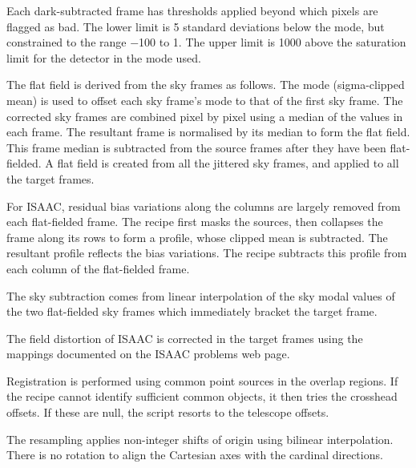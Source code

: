 \documentclass[twoside,11pt]{article}
\newcommand{\htmladdnormallink}[2]{#1}
\renewcommand{\_}{\texttt{\symbol{95}}}
\newcommand{\sstitem}{\item}
\begin{document}
{{{         \sstitem
         Each dark-subtracted frame has thresholds applied beyond which
         pixels are flagged as bad.  The lower limit is 5 standard
         deviations below the mode, but constrained to the range $-$100 to 1.
         The upper limit is 1000 above the saturation limit for the detector
         in the mode used.

         \sstitem
         The flat field is derived from the sky frames as follows.  The
         mode (sigma-clipped mean) is used to offset each sky frame's mode
         to that of the first sky frame.  The corrected sky frames are
         combined pixel by pixel using a median of the values in each
         frame.  The resultant frame is normalised by its median to form
         the flat field.  This frame median is subtracted from the source
         frames after they have been flat-fielded.  A flat field is created
         from all the jittered sky frames, and applied to all the target
         frames.

         \sstitem
         For ISAAC, residual bias variations along the columns are
         largely removed from each flat-fielded frame.  The recipe first
         masks the sources, then collapses the frame along its rows to form
         a profile, whose clipped mean is subtracted.  The resultant profile
         reflects the bias variations.  The recipe subtracts this profile
         from each column of the flat-fielded frame.

         \sstitem
         The sky subtraction comes from linear interpolation of the sky
         modal values of the two flat-fielded sky frames which immediately
         bracket the target frame.

         \sstitem
         The field distortion of ISAAC is corrected in the target frames
         using the mappings documented on the 
         \htmladdnormallink{ISAAC problems web page}
         {http://www.eso.org/instruments/isaac/problems_tips.html}.

         \sstitem
         Registration is performed using common point sources in the
         overlap regions.  If the recipe cannot identify sufficient common
         objects, it then tries the crosshead offsets.  If these are null,
         the script resorts to the telescope offsets.

         \sstitem
         The resampling applies non-integer shifts of origin using
         bilinear interpolation.  There is no rotation to align the
         Cartesian axes with the cardinal directions.

}}}
\end{document}

